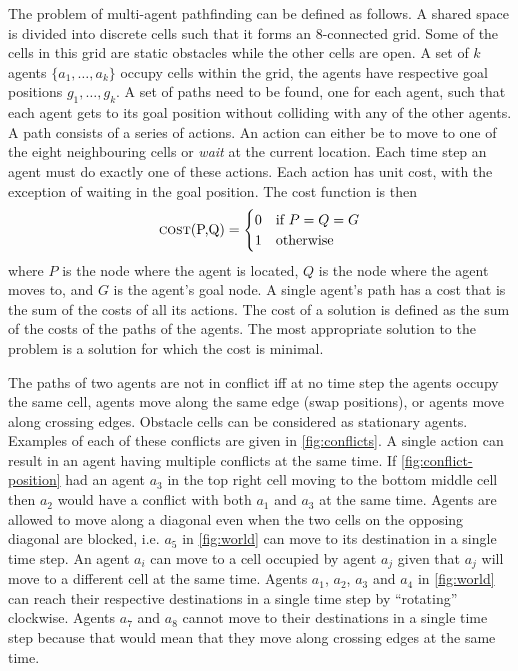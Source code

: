 The problem of multi-agent pathfinding can be defined as follows. A shared
space is divided into discrete cells such that it forms an 8-connected grid.
Some of the cells in this grid are static obstacles while the other cells are
open. A set of $k$ agents $\{a_1, \ldots, a_k\}$ occupy cells within the grid,
the agents have respective goal positions $g_1, \ldots, g_k$. A set of paths
need to be found, one for each agent, such that each agent gets to its goal
position without colliding with any of the other agents. A path consists of a
series of actions. An action can either be to move to one of the eight
neighbouring cells or \emph{wait} at the current location. Each time step an
agent must do exactly one of these actions. Each action has unit cost, with the
exception of waiting in the goal position. The cost function is then
\[
\text{\textsc{cost}(P,Q)} =
\begin{cases}
    0 & \text{if } P = Q = G \\
    1 & \text{otherwise}
\end{cases}
\]
where $P$ is the node where the agent is located, $Q$ is the node where the
agent moves to, and $G$ is the agent's goal node. A single agent's path has a
cost that is the sum of the costs of all its actions. The cost of a solution is
defined as the sum of the costs of the paths of the agents. The most
appropriate solution to the problem is a solution for which the cost is minimal.

The paths of two agents are not in conflict iff at no time step the agents
occupy the same cell, agents move along the same edge (swap positions), or
agents move along crossing edges. Obstacle cells can be considered as
stationary agents. Examples of each of these conflicts are given in
\autoref{fig:conflicts}. A single action can result in an agent having multiple
conflicts at the same time. If \autoref{fig:conflict-position} had an agent
$a_3$ in the top right cell moving to the bottom middle cell then $a_2$ would
have a conflict with both $a_1$ and $a_3$ at the same time. Agents are allowed
to move along a diagonal even when the two cells on the opposing diagonal are
blocked, i.e. $a_5$ in \autoref{fig:world} can move to its destination in a
single time step. An agent $a_i$ can move to a cell occupied by agent $a_j$
given that $a_j$ will move to a different cell at the same time. Agents $a_1$,
$a_2$, $a_3$ and $a_4$ in \autoref{fig:world} can reach their respective
destinations in a single time step by ``rotating'' clockwise. Agents $a_7$ and
$a_8$ cannot move to their destinations in a single time step because that
would mean that they move along crossing edges at the same time.
